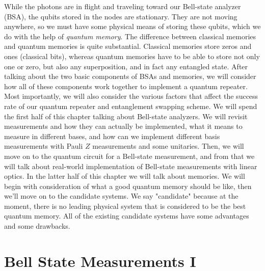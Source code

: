 While the photons are in flight and traveling toward our Bell-state analyzer (BSA), the qubits stored in the nodes are stationary. They are not moving anywhere, so we must have some physical means of storing these qubits, which we do with the help of \emph{quantum memory}. The difference between classical memories and quantum memories is quite substantial. Classical memories store zeros and ones (classical bits), whereas quantum memories have to be able to store not only one or zero, but also any superposition, and in fact any entangled state. 
After talking about the two basic components of BSAs and memories, we will consider how all of these components work together to implement a quantum repeater. Most importantly, we will also consider the various factors that affect the success rate of our quantum repeater and entanglement swapping scheme. We will spend the first half of this chapter talking about Bell-state analyzers. We will revisit measurements and how they can actually be implemented, what it means to measure in different bases, and how can we implement different basis measurements with Pauli $Z$ measurements and some unitaries. Then, we will move on to the quantum circuit for a Bell-state measurement, and from that we will talk about real-world implementation of Bell-state measurements with linear optics.  In the latter half of this chapter we will talk about memories. We will begin with consideration of what a good quantum memory should be like, then we'll move on to the candidate systems.  We say "candidate" because at the moment, there is no leading physical system that is considered to be the best quantum memory. All of the existing candidate systems have some advantages and some drawbacks.



\section{Bell State Measurements I}

